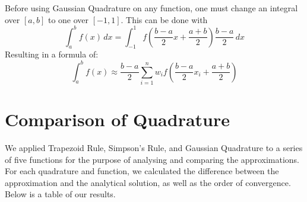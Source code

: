 \documentclass[12pt]{article}
\begin{document}
Before using Gaussian Quadrature on any function, one must change an integral over $[a,b]$ to one over $[-1,1]$. This can be done with
\begin{equation*}
	\int_{a}^{b} f(x) \,dx = \int_{-1}^{1}f \left(\frac{b-a}{2}x+\frac{a+b}{2}\right)\frac{b-a}{2} \,dx
\end{equation*}
Resulting in a formula of:
\begin{equation}
	\int_{a}^{b}f(x) \approx \frac{b-a}{2}\sum_{i=1}^{n}w_{i}f \left(\frac{b-a}{2}x_{i}+\frac{a+b}{2} \right)
\end{equation}

\section{Comparison of Quadrature}


% 


% 


% 
% 

We applied Trapezoid Rule, Simpson's Rule, and Gaussian Quadrature to a series of five functions for the purpose of
analysing and comparing the approximations. For each quadrature and function, we calculated the difference between
the approximation and the analytical solution, as well as the order of convergence. Below is a table of our results.
\end{document}
